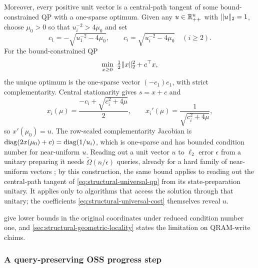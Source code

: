 Moreover, every positive unit vector is a central-path tangent of some
bound-constrained QP with a one-sparse optimum.  Given any $u\in\mathbb{R}_{++}^n$ with $\lVert u\rVert_2=1$, choose $\mu_0>0$ so
that $u_i^{-2}>4\mu_0$ and set
\begin{equation}
 c_1=-\sqrt{u_1^{-2}-4\mu_0},\qquad
 c_i=\sqrt{u_i^{-2}-4\mu_0}\quad(i\geq2).                \label{eq:structural-universal-cost}
\end{equation}
For the bound-constrained QP
\begin{equation}
 \min_{x\geq0}\ \tfrac12\norm x_2^2+c^\top x,               \label{eq:structural-universal-qp}
\end{equation}
the unique optimum is the one-sparse vector $(-c_1)e_1$, with strict
complementarity.  Central stationarity gives $s=x+c$ and
\begin{equation}
 x_i(\mu)=\frac{-c_i+\sqrt{c_i^2+4\mu}}2,\qquad
 x_i'(\mu)=\frac1{\sqrt{c_i^2+4\mu}},
\end{equation}
so $x'(\mu_0)=u$.  The row-scaled complementarity Jacobian is
$\operatorname{diag}(2x(\mu_0)+c)=\operatorname{diag}(1/u_i)$, which is one-sparse and has bounded
condition number for near-uniform $u$.  Reading out a unit vector $u$ to
$\ell_2$ error $\epsilon$ from a unitary preparing it needs
$\widetilde\Omega(n/\epsilon)$ queries, already for a hard family of
near-uniform vectors
\cite{joran2023-quantum-tomography-state-preparation-unitaries}; by this
construction, the same bound applies to reading out the central-path tangent
of \eqref{eq:structural-universal-qp} from its state-preparation unitary.
It applies only to algorithms that access the solution through that
unitary; the coefficients \eqref{eq:structural-universal-cost} themselves
reveal $u$.

 give lower bounds in
the original coordinates under reduced condition number one, and
\cref{sec:structural-geometric-locality} states the limitation on
QRAM-write claims.

\subsubsection{A query-preserving OSS progress step}

